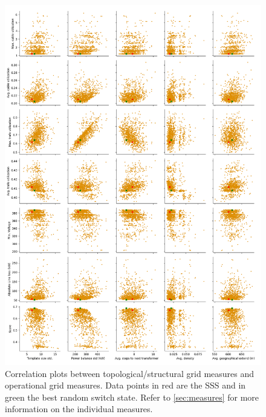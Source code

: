   \begin{figure}[H]
    \begin{center}
        \includegraphics[width=\linewidth]{img/switchstate_exploring/urban2/correleation.png}
    \end{center}
    \caption{
      Correlation plots between topological/structural grid measures and 
      operational grid measures. Data points in red are the SSS and in green the best random switch state.
      Refer to \autoref{sec:measures} for more
      information on the individual measures.
    }
    \label{fig:appendix:urban2:correleation}
  \end{figure}